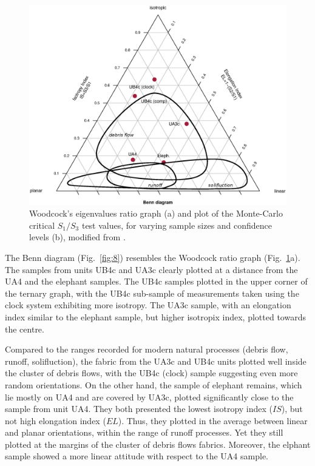 \documentclass[preprint,authoryear,times]{elsarticle} %
\begin{document}
\begin{figure}[]
  \centering
  \includegraphics[width=1\textwidth]{../artwork/Fig7.eps}
  \caption{Woodcock's eigenvalues ratio graph (a) and plot of the Monte-Carlo critical $S_1/S_3$ test values, for varying sample sizes and confidence levels (b), modified from \cite{Woodcock1983}.}
  \label{fig:7}
\end{figure}

The Benn diagram (Fig.~\ref{fig:8}) resembles the Woodcock ratio graph (Fig.~\ref{fig:7}a). The samples from units UB4c and UA3c clearly plotted at a distance from the UA4 and the elephant samples. The UB4c samples plotted in the upper corner of the ternary graph, with the UB4c sub-sample of measurements taken using the clock system exhibiting more isotropy. The UA3c sample, with an elongation index similar to the elephant sample, but higher isotropix index, plotted towards the centre.

Compared to the ranges recorded for modern natural processes (debris flow, runoff, solifluction), the fabric from the UA3c and UB4c units plotted well inside the cluster of debris flows, with the UB4c (clock) sample suggesting even more random orientations. On the other hand, the sample of elephant remains, which lie mostly on UA4 and are covered by UA3c, plotted significantly close to the sample from unit UA4. They both presented the lowest isotropy index ($IS$), but not high elongation index ($EL$). Thus, they plotted in the average between linear and planar orientations, within the range of runoff processes. Yet they still plotted at the margins of the cluster of debris flows fabrics. Moreover, the elphant sample showed a more linear attitude with respect to the UA4 sample.
\end{document}
